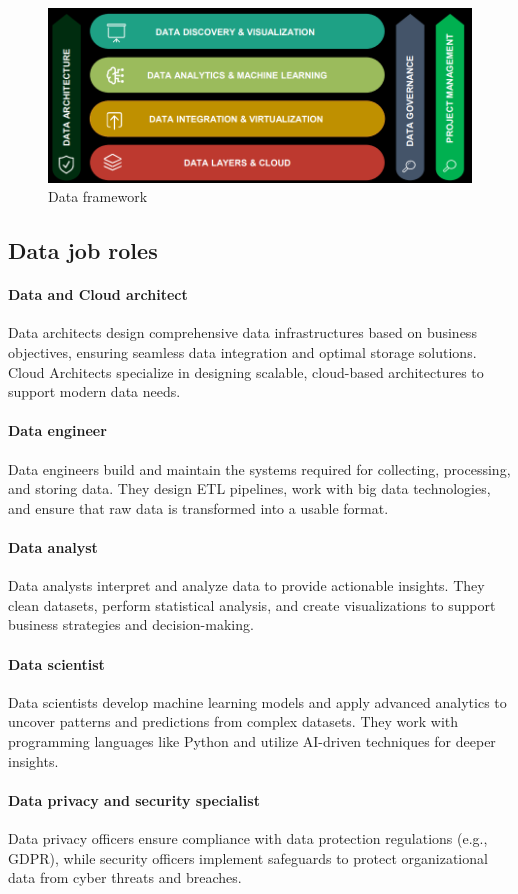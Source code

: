\begin{figure}[H]
    \centering
    \includegraphics[width=0.5\linewidth]{images/bis3.png}
    \caption{Data framework}
\end{figure}


\subsection{Data job roles}

\paragraph*{Data and Cloud architect}
Data architects design comprehensive data infrastructures based on business objectives, ensuring seamless data integration and optimal storage solutions. 
Cloud Architects specialize in designing scalable, cloud-based architectures to support modern data needs.

\paragraph*{Data engineer}
Data engineers build and maintain the systems required for collecting, processing, and storing data. 
They design ETL pipelines, work with big data technologies, and ensure that raw data is transformed into a usable format.

\paragraph*{Data analyst}
Data analysts interpret and analyze data to provide actionable insights. 
They clean datasets, perform statistical analysis, and create visualizations to support business strategies and decision-making.

\paragraph*{Data scientist}
Data scientists develop machine learning models and apply advanced analytics to uncover patterns and predictions from complex datasets. 
They work with programming languages like Python and utilize AI-driven techniques for deeper insights.

\paragraph*{Data privacy and security specialist}
Data privacy officers ensure compliance with data protection regulations (e.g., GDPR), while security officers implement safeguards to protect organizational data from cyber threats and breaches.
